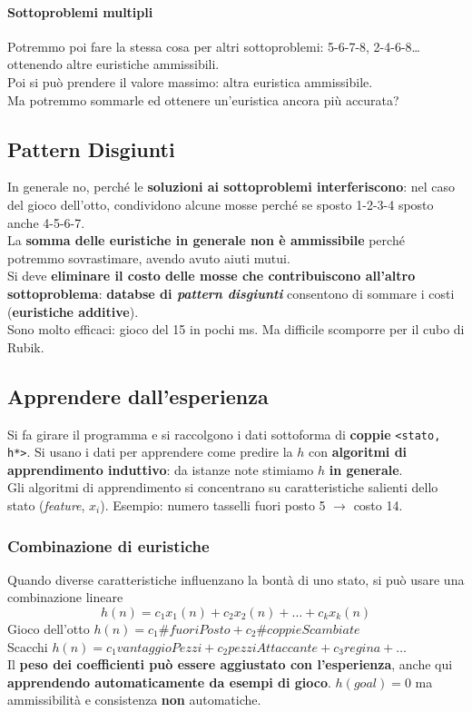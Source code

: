 \documentclass[10pt]{book}
\begin{document}
\paragraph{Sottoproblemi multipli} Potremmo poi fare la stessa cosa per altri sottoproblemi: 5-6-7-8, 2-4-6-8\ldots ottenendo altre euristiche ammissibili.\\
Poi si può prendere il valore massimo: altra euristica ammissibile.\\
Ma potremmo sommarle ed ottenere un'euristica ancora più accurata?
\subsection{Pattern Disgiunti} In generale no, perché le \textbf{soluzioni ai sottoproblemi interferiscono}: nel caso del gioco dell'otto, condividono alcune mosse perché se sposto 1-2-3-4 sposto anche 4-5-6-7.\\
La \textbf{somma delle euristiche in generale non è ammissibile} perché potremmo sovrastimare, avendo avuto aiuti mutui.\\
Si deve \textbf{eliminare il costo delle mosse che contribuiscono all'altro sottoproblema}: \textbf{databse di \textit{pattern disgiunti}} consentono di sommare i costi (\textbf{euristiche additive}).\\
Sono molto efficaci: gioco del 15 in pochi ms. Ma difficile scomporre per il cubo di Rubik.
\subsection{Apprendere dall'esperienza}
Si fa girare il programma e si raccolgono i dati sottoforma di \textbf{coppie} \texttt{<stato, h*>}. Si usano i dati per apprendere come predire la $h$ con \textbf{algoritmi di apprendimento induttivo}: da istanze note stimiamo $h$ \textbf{in generale}.\\
Gli algoritmi di apprendimento si concentrano su caratteristiche salienti dello stato (\textit{feature}, $x_i$). Esempio: numero tasselli fuori posto 5 $\rightarrow$ costo 14.
\subsubsection{Combinazione di euristiche}
Quando diverse caratteristiche influenzano la bontà di uno stato, si può usare una combinazione lineare $$h(n)= c_1 x_1(n) + c_2 x_2(n) + \ldots + c_k x_k(n)$$
Gioco dell'otto $h(n) = c_1 \#fuoriPosto + c_2 \#coppieScambiate$\\
Scacchi $h(n) = c_1 vantaggioPezzi + c_2 pezziAttaccante + c_3 regina + \ldots$\\
Il \textbf{peso dei coefficienti può essere aggiustato con l'esperienza}, anche qui \textbf{apprendendo automaticamente da esempi di gioco}. $h(goal) = 0$ ma ammissibilità e consistenza \textbf{non} automatiche.
\end{document}
